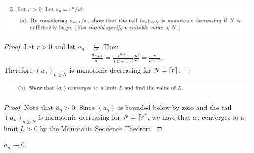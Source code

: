 \documentclass[12pt]{article}
\begin{document}
\newpage
\subsection{}
\begin{mdframed}
  \includegraphics[width=400pt]{img/oxford-M2-analysis-I-4-5-a.png}
\end{mdframed}

\begin{proof}
  Let $r > 0$ and let $a_n = \frac{r^n}{n!}$. Then
  \begin{align*}
    \frac{a_{n+1}}{a_n} = \frac{r^{n+1}}{(n+1)!}\frac{n!}{r^n} = \frac{r}{n+1}.
  \end{align*}
  Therefore $(a_n)_{n \geq N}$ is monotonic decreasing for $N = \lceil r\rceil$.
\end{proof}

\begin{mdframed}
  \includegraphics[width=400pt]{img/oxford-M2-analysis-I-4-5-b.png}
\end{mdframed}

\begin{proof}
  Note that $a_n > 0$. Since $(a_n)$ is bounded below by zero and the tail $(a_n)_{n \geq N}$ is
  monotonic decreasing for $N = \lceil r\rceil$, we have that $a_n$ converges to a limit $L > 0$ by the
  Monotonic Sequence Theorem.
\end{proof}

\begin{claim*}
  $a_n \to 0$.
\end{claim*}
\end{document}
